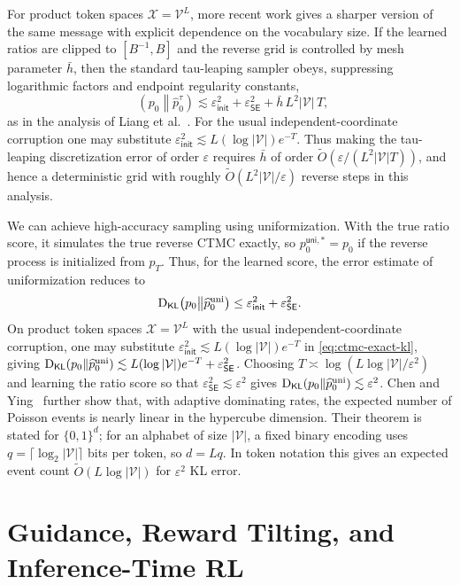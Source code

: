 \documentclass{amsart}
\numberwithin{equation}{section}
\theoremstyle{plain}
\theoremstyle{definition}
\theoremstyle{remark}
\DeclareMathOperator{\KL}{D_{\mathsf{KL}}}
\newcommand{\cX}{\mathcal{X}}
\newcommand{\mc}[1]{\mathcal{#1}}
\newcommand{\wh}[1]{\widehat{#1}}
\newcommand{\eps}{\varepsilon}
\newcommand{\epsinit}{\varepsilon_{\mathsf{init}}}
\newcommand{\epsSE}{\varepsilon_{\mathsf{SE}}}
\newcommand{\tO}{\widetilde O}
\begin{document}
For product token spaces $\cX=\mc{V}^L$, more recent work gives a sharper
version of the same message with explicit dependence on the vocabulary size.
If the learned ratios are clipped to $[B^{-1},B]$ and the reverse grid is
controlled by mesh parameter $\bar h$, then the standard tau-leaping sampler
obeys, suppressing logarithmic factors and endpoint regularity constants,
\begin{equation}\label{eq:tau-leaping-kl-product}
    \KL\!\left(p_0\middle\|\wh p_0^\tau\right)
    \lesssim
    \epsinit^2
    +\epsSE^2
    +\bar h\, L^2|\mc{V}|\,T,
\end{equation}
as in the analysis of Liang et al.~\cite{liang2025sampler}.  For the usual
independent-coordinate corruption one may substitute
$\epsinit^2\lesssim L(\log|\mc{V}|)e^{-T}$.  Thus making the tau-leaping
discretization error of order $\eps$ requires
$\bar h$ of order $\tO(\eps/(L^2|\mc{V}|T))$, and hence a deterministic grid
with roughly $\tO(L^2|\mc{V}|/\eps)$ reverse steps in this analysis.

We can achieve high-accuracy sampling using uniformization.  With the true
ratio score, it simulates the true reverse CTMC exactly, so
$p_0^{\mathsf{uni},*}=p_0$ if the reverse process is initialized from
$p_T$.  Thus, for the learned score, the error estimate of uniformization reduces to
\begin{equation}\label{eq:ctmc-exact-kl}
    \KL\!\left(p_0\middle\|\wh p_0^{\rm uni}\right)
    \leq
    \epsinit^2
    +\epsSE^2.
\end{equation}
On product token spaces $\cX=\mc{V}^L$ with the usual independent-coordinate
corruption, one may substitute
$\epsinit^2\lesssim L(\log|\mc{V}|)e^{-T}$ in \eqref{eq:ctmc-exact-kl}, giving
$\KL(p_0\|\wh p_0^{\rm uni})\lesssim
L(\log|\mc{V}|)e^{-T}+\epsSE^2$.
Choosing $T\asymp\log(L\log|\mc{V}|/\eps^2)$ and learning the ratio score so
that $\epsSE^2\lesssim\eps^2$ gives
$\KL(p_0\|\wh p_0^{\rm uni})\lesssim\eps^2$.  Chen and
Ying~\cite{chenying2024discrete} further show that, with adaptive dominating
rates, the expected number of Poisson events is nearly linear in the hypercube
dimension.  Their theorem is stated for $\{0,1\}^d$; for an alphabet of size
$|\mc{V}|$, a fixed binary encoding uses
$q=\lceil\log_2|\mc{V}|\rceil$ bits per token, so $d=Lq$.  In token notation
this gives an expected event count
$\tO\!\left(L\log|\mc{V}|\right)$
for $\eps^2$ KL error.

\section{Guidance, Reward Tilting, and Inference-Time RL}
\label{sec:guidance}
\end{document}
